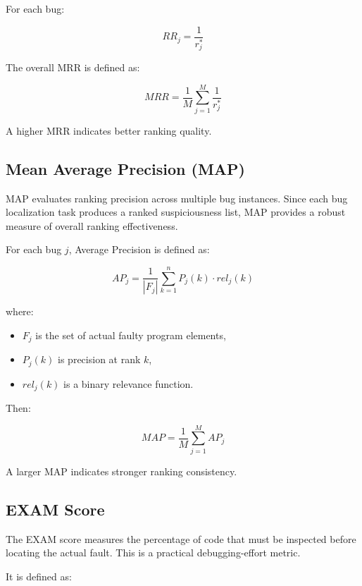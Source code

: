 \documentclass[article,article,submit,pdftex,moreauthors]{Definitions/mdpi}
\begin{document}
For each bug:

\begin{equation}
RR_j = \frac{1}{r_j^*}
\end{equation}

The overall MRR is defined as:

\begin{equation}
MRR =
\frac{1}{M}
\sum_{j=1}^{M}
\frac{1}{r_j^*}
\end{equation}

A higher MRR indicates better ranking quality.

\subsection{Mean Average Precision (MAP)}

MAP evaluates ranking precision across multiple bug instances. Since each bug localization task produces a ranked suspiciousness list, MAP provides a robust measure of overall ranking effectiveness.

For each bug $j$, Average Precision is defined as:

\begin{equation}
AP_j =
\frac{1}{|F_j|}
\sum_{k=1}^{n}
P_j(k)\cdot rel_j(k)
\end{equation}

where:
\begin{itemize}
    \item $F_j$ is the set of actual faulty program elements,
    \item $P_j(k)$ is precision at rank $k$,
    \item $rel_j(k)$ is a binary relevance function.
\end{itemize}

Then:

\begin{equation}
MAP =
\frac{1}{M}
\sum_{j=1}^{M}
AP_j
\end{equation}

A larger MAP indicates stronger ranking consistency.

\subsection{EXAM Score}

The EXAM score measures the percentage of code that must be inspected before locating the actual fault. This is a practical debugging-effort metric.

It is defined as:
\end{document}
